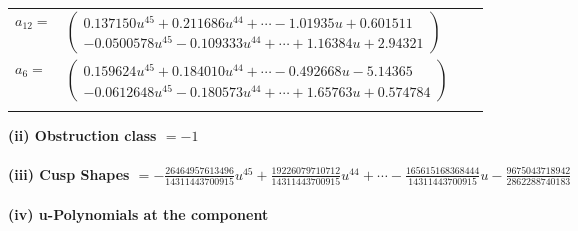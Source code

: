 \documentclass[1p]{elsarticle_modified}
\theoremstyle{definition}
\begin{document}
\begin{tabular}{m{7pt} m{180pt} m{7pt} m{180pt} }
\flushright $a_{12}=$&$\begin{pmatrix}0.137150 u^{45}+0.211686 u^{44}+\cdots-1.01935 u+0.601511\\-0.0500578 u^{45}-0.109333 u^{44}+\cdots+1.16384 u+2.94321\end{pmatrix}$ \\
\flushright $a_{6}=$&$\begin{pmatrix}0.159624 u^{45}+0.184010 u^{44}+\cdots-0.492668 u-5.14365\\-0.0612648 u^{45}-0.180573 u^{44}+\cdots+1.65763 u+0.574784\end{pmatrix}$\\&\end{tabular}
\flushleft \textbf{(ii) Obstruction class $= -1$}\\~\\
\flushleft \textbf{(iii) Cusp Shapes $= -\frac{26464957613496}{14311443700915} u^{45}+\frac{19226079710712}{14311443700915} u^{44}+\cdots-\frac{165615168368444}{14311443700915} u-\frac{9675043718942}{2862288740183}$}\\~\\
\newpage\renewcommand{\arraystretch}{1}
\flushleft \textbf{(iv) u-Polynomials at the component}\newline \\
\end{document}
